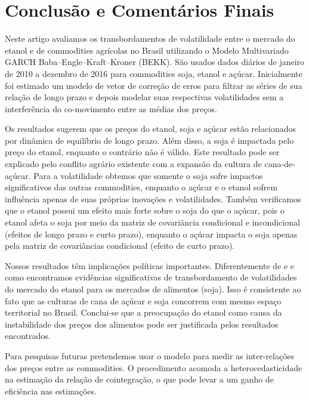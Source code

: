 \section{Conclusão e Comentários Finais}

Neste artigo avaliamos os transbordamentos de volatilidade entre o mercado do etanol e de commodities agrícolas no Brasil utilizando o Modelo Multivariado GARCH Baba–Engle–Kraft–Kroner (BEKK). São usados dados diários de janeiro de 2010 a dezembro de 2016 para commodities soja, etanol e açúcar. Inicialmente foi estimado um modelo de vetor de correção de erros para filtrar as séries de sua relação de longo prazo e depois modelar suas respectivas volatilidades sem a interferência do co-movimento entre as médias dos preços.

Os resultados sugerem que os preços do etanol, soja e açúcar estão relacionados por dinâmica de equilíbrio de longo prazo. Além disso, a soja é impactada pelo  preço do etanol, enquanto o contrário não é válido. Este resultado pode ser explicado pelo conflito agrário existente com a expansão da cultura de cana-de-açúcar. Para a volatilidade obtemos que  somente o soja sofre impactos significativos das outras commodities, enquanto o açúcar e o etanol sofrem influência apenas de suas próprias inovações e volatilidades. Também verificamos que  o etanol possui um efeito mais forte sobre o soja do que o açúcar, pois o etanol afeta o soja por meio da matriz de covariância condicional e incondicional (efeitos de longo prazo e curto prazo), enquanto o açúcar impacta o soja apenas pela matriz de covariâncias condicional (efeito de curto prazo).

Nossos resultados têm implicações políticas importantes. Diferentemente de  e  e como  encontramos evidências significativas de transbordamento de volatilidades do mercado do etanol para os mercados de alimentos (soja). Isso é consistente ao fato que as culturas de cana de açúcar e soja concorrem com mesmo espaço territorial no Brasil. Conclui-se que a preocupação do etanol como causa da instabilidade dos preços dos alimentos pode ser justificada pelos resultados encontrados. 

Para pesquisas futuras pretendemos usar o modelo   para medir as inter-relações dos preços entre as commodities. O procedimento  acomoda a heterocedasticidade na estimação da relação de cointegração, o que pode levar  a  um ganho de eficiência nas estimações. 

